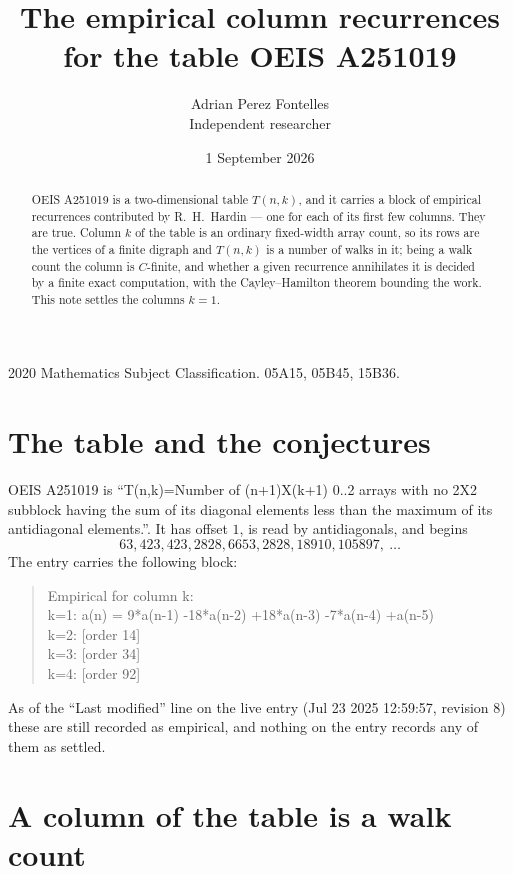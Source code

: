 \documentclass[11pt,a4paper]{article}
\title{The empirical column recurrences for the table OEIS A251019}
\author{Adrian Perez Fontelles\\ \small Independent researcher}
\date{1 September 2026}
\theoremstyle{plain}
\theoremstyle{definition}
\begin{document}
\maketitle

\begin{abstract}
OEIS A251019 is a two-dimensional table $T(n,k)$, and it carries a block of empirical
recurrences contributed by R.~H.~Hardin --- one for each of its first few columns. They are
true. Column $k$ of the table is an ordinary fixed-width array count, so its rows are the
vertices of a finite digraph and $T(n,k)$ is a number of walks in it; being a walk count the
column is $C$-finite, and whether a given recurrence annihilates it is decided by a finite
exact computation, with the Cayley--Hamilton theorem bounding the work. This note settles the
columns $k=1$.
\end{abstract}

\noindent\small 2020 Mathematics Subject Classification. 05A15, 05B45, 15B36.\normalsize

\section{The table and the conjectures}

OEIS A251019 is ``T(n,k)=Number of (n+1)X(k+1) 0..2 arrays with no 2X2 subblock having the sum of its diagonal elements less than the maximum of its antidiagonal elements.''. It has offset $1$, is
read by antidiagonals, and begins
\[
63, 423, 423, 2828, 6653, 2828, 18910, 105897,\ \dots
\]
The entry carries the following block:
\begin{quote}\small
Empirical for column k:\\
k=1: a(n) = 9*a(n-1) -18*a(n-2) +18*a(n-3) -7*a(n-4) +a(n-5)\\
k=2: [order 14]\\
k=3: [order 34]\\
k=4: [order 92]\\
\end{quote}
As of the ``Last modified'' line on the live entry (Jul 23 2025 12:59:57, revision 8) these are still
recorded as empirical, and nothing on the entry records any of them as settled.

\section{A column of the table is a walk count}
\end{document}
